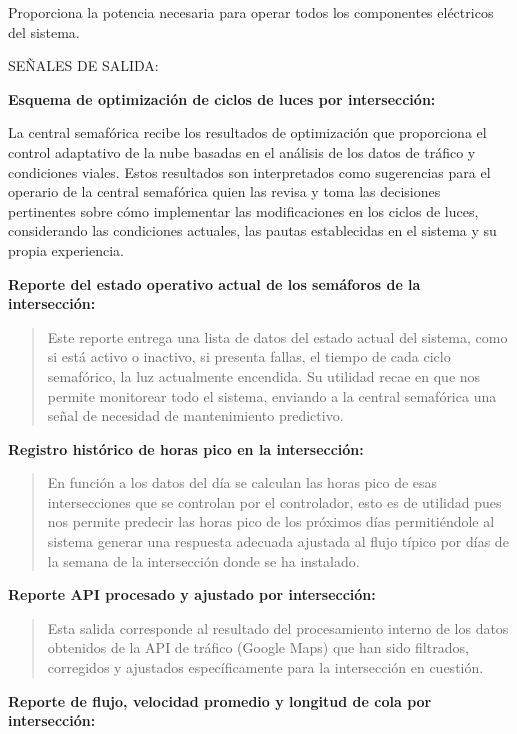 \documentclass[12pt,a4paper,oneside]{report}
\begin{document}
Proporciona la potencia necesaria para operar todos los componentes eléctricos del sistema.

SEÑALES DE SALIDA:

\textbf{Esquema de optimización de ciclos de luces por intersección:}

La central semafórica recibe los resultados de optimización que proporciona el control adaptativo de la nube basadas en el análisis de los datos de tráfico y condiciones viales. Estos resultados son interpretados como sugerencias para el operario de la central semafórica quien las revisa y toma las decisiones pertinentes sobre cómo implementar las modificaciones en los ciclos de luces, considerando las condiciones actuales, las pautas establecidas en el sistema y su propia experiencia.

\textbf{Reporte del estado operativo actual de los semáforos de la intersección:}

\begin{quote}
Este reporte entrega una lista de datos del estado actual del sistema, como si está activo o inactivo, si presenta fallas, el tiempo de cada ciclo semafórico, la luz actualmente encendida. Su utilidad recae en que nos permite monitorear todo el sistema, enviando a la central semafórica una señal de necesidad de mantenimiento predictivo.
\end{quote}

\textbf{Registro histórico de horas pico en la intersección:}

\begin{quote}
En función a los datos del día se calculan las horas pico de esas intersecciones que se controlan por el controlador, esto es de utilidad pues nos permite predecir las horas pico de los próximos días permitiéndole al sistema generar una respuesta adecuada ajustada al flujo típico por días de la semana de la intersección donde se ha instalado.
\end{quote}

\textbf{Reporte API procesado y ajustado por intersección:}

\begin{quote}
Esta salida corresponde al resultado del procesamiento interno de los datos obtenidos de la API de tráfico (Google Maps) que han sido filtrados, corregidos y ajustados específicamente para la intersección en cuestión.
\end{quote}

\textbf{Reporte de flujo, velocidad promedio y longitud de cola por intersección:}
\end{document}
